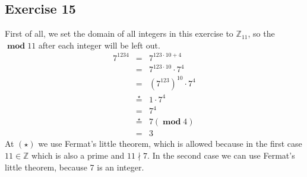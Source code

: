 \documentclass[a4paper]{article}
\newcommand{\exercise}[2]{\subsection*{Exercise #1}{#2}}
\newcommand{\ZZ}{\ensuremath{\mathbb{Z}}}
\DeclareMathOperator{\emod}{\mathbf{mod}}
\begin{document}
\exercise{15}{%
First of all, we set the domain of all integers in this exercise to $\ZZ_{11}$, so the $\emod11$ after each integer will be left out.
\begin{eqnarray*}
7^{1234} &=& 7^{123 \cdot 10 + 4} \\
&=& 7^{123 \cdot 10} \cdot 7^4 \\
&=& (7^{123})^{10} \cdot 7^4 \\
&\stackrel{\star}{=}& 1 \cdot 7^4 \\
&=& 7^4 \\
&\stackrel{\star}{=}& 7(\emod 4) \\
&=& 3
\end{eqnarray*}
At $(\star)$ we use Fermat's little theorem,
which is allowed because in the first case $11 \in \ZZ$ which is also a prime and $11 \nmid 7$. In the second case we can use Fermat's little theorem, because 7 is an integer.
}
\end{document}
